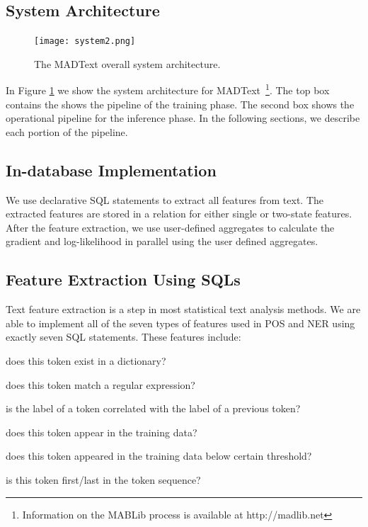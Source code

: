\documentclass[11pt,letterpaper]{article}
\begin{document}
\subsection{System Architecture}
\begin{figure}
\centering
\texttt{[image: system2.png]}
\caption{The MADText overall system architecture.}
\label{fig:systemarch}
\end{figure}

In Figure \ref{fig:systemarch} we show the system architecture for MADText~\footnote{Information on the MABLib process is available at http://madlib.net}. 
The top box contains the shows  the pipeline of the training phase. 
The second box shows the operational pipeline for the inference phase.
In the following sections, we describe each portion of the pipeline.

\subsection{In-database Implementation}
We use declarative SQL statements to extract all features from text.
The extracted features are stored in a relation for either single or two-state features.
After the feature extraction, we use user-defined aggregates to calculate the gradient and log-likelihood in parallel using the user defined aggregates.


\subsection{Feature Extraction Using SQLs}
Text feature extraction is a step in most statistical text analysis methods.
We are able to implement all of the seven types of features used in POS and NER using exactly seven 
SQL statements. These features include: 
\begin{description}[noitemsep]
\item[Dictionary:] does this token exist in a dictionary? 
\item[Regex:] does this token match a regular expression? 
\item[Edge:] is the label of a token correlated with the label of a previous token? 
\item[Word:] does this token appear in the training data?
\item[Unknown:] does this token appeared in the training data below certain threshold? 
\item[Start/End:] is this token first/last in the token sequence?
\end{description}
\end{document}
